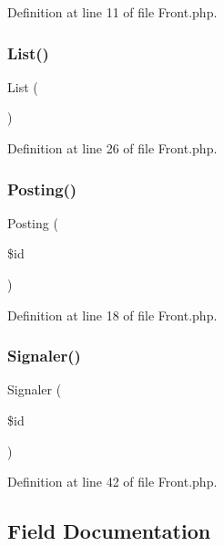 Definition at line 11 of file Front.\+php.

\mbox{\label{class_src_1_1_controllers_1_1_front_a17e6c90f14225bdac5c65ed915b0a2f6}} 
\subsubsection{List()}
{\footnotesize\ttfamily List (\begin{DoxyParamCaption}{ }\end{DoxyParamCaption})}



Definition at line 26 of file Front.\+php.

\mbox{\label{class_src_1_1_controllers_1_1_front_a5fcbe325afb03acc6e4eaec38a7bb1ae}} 
\subsubsection{Posting()}
{\footnotesize\ttfamily Posting (\begin{DoxyParamCaption}\item[{}]{\$id }\end{DoxyParamCaption})}



Definition at line 18 of file Front.\+php.

\mbox{\label{class_src_1_1_controllers_1_1_front_a8b22c40bd1737bbb7db0816b7e9763b3}} 
\subsubsection{Signaler()}
{\footnotesize\ttfamily Signaler (\begin{DoxyParamCaption}\item[{}]{\$id }\end{DoxyParamCaption})}



Definition at line 42 of file Front.\+php.



\subsection{Field Documentation}
\mbox{\label{class_src_1_1_controllers_1_1_front_ae6f0a6c86ad9f61cbc99ad3c4180b481}} 
